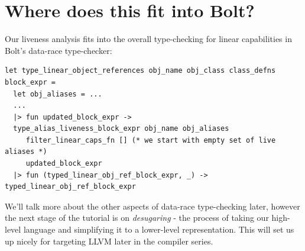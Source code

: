 %
%
%
%

\hypertarget{where-does-this-fit-into-bolt}{%
\section{\texorpdfstring{\protect\hyperlink{where-does-this-fit-into-bolt}{}Where
does this fit into
Bolt?}{Where does this fit into Bolt?}}\label{where-does-this-fit-into-bolt}}

Our liveness analysis fits into the overall type-checking for linear
capabilities in Bolt's data-race type-checker:

%

\begin{lstlisting}[language=caml,caption={type\_linear\_capabilities.ml}]
let type_linear_object_references obj_name obj_class class_defns block_expr =
  let obj_aliases = ...
  ...
  |> fun updated_block_expr ->
  type_alias_liveness_block_expr obj_name obj_aliases
     filter_linear_caps_fn [] (* we start with empty set of live aliases *)
     updated_block_expr
  |> fun (typed_linear_obj_ref_block_expr, _) -> typed_linear_obj_ref_block_expr
\end{lstlisting}

We'll talk more about the other aspects of data-race type-checking
later, however the next stage of the tutorial is on \emph{desugaring} -
the process of taking our high-level language and simplifying it to a
lower-level representation. This will set us up nicely for targeting
LLVM later in the compiler series.

